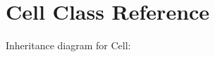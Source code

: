 \hypertarget{class_cell}{}\section{Cell Class Reference}
\label{class_cell}


Inheritance diagram for Cell\+:
